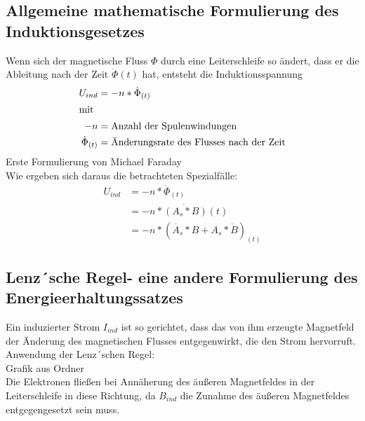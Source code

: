 	\subsection{Allgemeine mathematische Formulierung des Induktionsgesetzes}
	Wenn sich der magnetische Fluss $\Phi$ durch eine Leiterschleife so ändert, dass er die Ableitung nach der Zeit $\dot{\Phi}(t)$ hat, entsteht die Induktionsspannung
	\begin{align}
	U_{ind}&=-n*\dot{\Phi}_{(t)}\\
	\intertext{mit}
	-n&=\text{Anzahl der Spulenwindungen}\nonumber\\
	\dot{\Phi}_{(t)}&=\text{Änderungsrate des Flusses nach der Zeit}\nonumber
	\end{align}
	Erste Formulierung von Michael Faraday\\
	Wie ergeben sich daraus die betrachteten Spezialfälle:
	\begin{align*}
	U_{ind}&=-n*\dot{\Phi}_{(t)}\\
	&=-n*\dot{(A_s*B)}(t)\\
	&=-n*(\dot{A_s}*B+A_s*\dot{B})_{(t)}
	\end{align*}
	\subsection{Lenz´sche Regel- eine andere Formulierung des Energieerhaltungssatzes}
	Ein induzierter Strom $I_{ind}$ ist so gerichtet, dass das von ihm erzeugte Magnetfeld der Änderung des magnetischen Flusses entgegenwirkt, die den Strom hervorruft.\\
	Anwendung der Lenz´schen Regel:\\
	Grafik aus Ordner\\
	Die Elektronen fließen bei Annäherung des äußeren Magnetfeldes in der Leiterschleife in diese Richtung, da $B_{ind}$ die Zunahme des äußeren Magnetfeldes entgegengesetzt sein muss.
